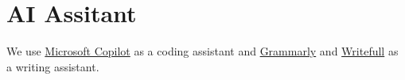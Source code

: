 \section{AI Assitant}
We use \href{https://copilot.microsoft.com/}{Microsoft Copilot} as a coding assistant and \href{https://grammarly.com/}{Grammarly} and \href{https://www.writefull.com/}{Writefull} as a writing assistant.